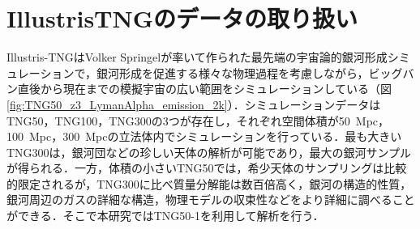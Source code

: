 \section{IllustrisTNGのデータの取り扱い}
%
%
%
%
%
%
%

Illustris-TNGはVolker Springelが率いて作られた最先端の宇宙論的銀河形成シミュレーションで，銀河形成を促進する様々な物理過程を考慮しながら，ビッグバン直後から現在までの模擬宇宙の広い範囲をシミュレーションしている（図\ref{fig:TNG50_z3_LymanAlpha_emission_2k}）．シミュレーションデータはTNG50，TNG100，TNG300の3つが存在し，それぞれ空間体積が\SI{50}{Mpc}，\SI{100}{Mpc}，\SI{300}{Mpc}の立法体内でシミュレーションを行っている．最も大きいTNG300は，銀河団などの珍しい天体の解析が可能であり，最大の銀河サンプルが得られる．一方，体積の小さいTNG50では，希少天体のサンプリングは比較的限定されるが，TNG300に比べ質量分解能は数百倍高く，銀河の構造的性質，銀河周辺のガスの詳細な構造，物理モデルの収束性などをより詳細に調べることができる．そこで本研究ではTNG50-1を利用して解析を行う．

